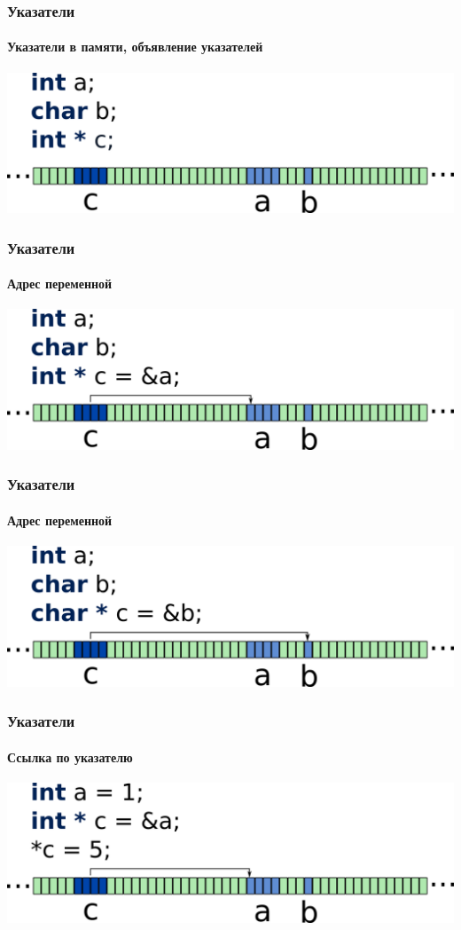 \documentclass[14pt,pdf,hyperref={unicode}]{beamer}
\begin{document}
\begin{frame}[fragile]
\frametitle{Указатели} 
\framesubtitle{Указатели в памяти, объявление указателей}
\begin{center}
\includegraphics[width=0.95\linewidth]{images/memory_pointer_1.png}
\end{center}
\end{frame}

\begin{frame}[fragile]
\frametitle{Указатели} 
\framesubtitle{Адрес переменной}
\begin{center}
\includegraphics[width=0.95\linewidth]{images/memory_pointer_2.png}
\end{center}
\end{frame}

\begin{frame}[fragile]
\frametitle{Указатели} 
\framesubtitle{Адрес переменной}
\begin{center}
\includegraphics[width=0.95\linewidth]{images/memory_pointer_3.png}
\end{center}
\end{frame}

\begin{frame}[fragile]
\frametitle{Указатели} 
\framesubtitle{Ссылка по указателю}
\begin{center}
\includegraphics[width=0.95\linewidth]{images/memory_pointer_4.png}
\end{center}
\end{frame}
\end{document}
